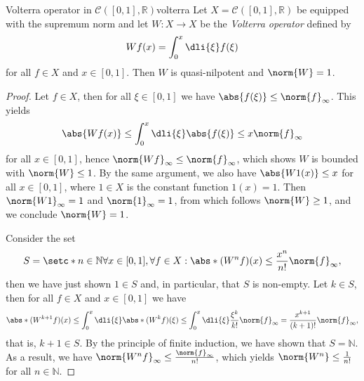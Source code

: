 \begin{example}{Volterra operator in \(\mathcal{C}([0, 1], \mathbb{R})\)}{volterra}
    Let \(X = \mathcal{C}([0,1], \mathbb{R})\) be equipped with the supremum norm and let \(W : X \to X\) be the \emph{Volterra operator} defined by
    \begin{equation*}
        Wf(x) = \int_0^x \dli{\xi} f(\xi)
    \end{equation*}
    for all \(f \in X\) and \(x \in [0,1]\). Then \(W\) is quasi-nilpotent and \(\norm{W} = 1\).
\end{example}
\begin{proof}
    Let \(f \in X\), then for all \(\xi \in [0,1]\) we have \(\abs{f(\xi)} \leq \norm{f}_\infty\). This yields
    \begin{equation*}
        \abs{Wf(x)} \leq \int_0^x \dli{\xi} \abs{f(\xi)} \leq x \norm{f}_\infty
    \end{equation*}
    for all \(x \in [0,1]\), hence \(\norm{Wf}_\infty \leq \norm{f}_\infty\), which shows \(W\) is bounded with \(\norm{W} \leq 1\). By the same argument, we also have \(\abs{W1(x)} \leq x\) for all \(x \in [0,1]\), where \(1 \in X\) is the constant function \(1(x) = 1\). Then \(\norm{W1}_\infty = 1\) and \(\norm{1}_\infty = 1\), from which follows \(\norm{W} \geq 1\), and we conclude \(\norm{W} = 1\).

    Consider the set
    \begin{equation*}
        S = \setc*{n \in \mathbb{N}}{\forall x \in [0,1], \forall f \in X : \abs*{(W^nf)(x)} \leq \frac{x^n}{n!} \norm{f}_\infty},
    \end{equation*}
    then we have just shown \(1 \in S\) and, in particular, that \(S\) is non-empty. Let \(k \in S\), then for all \(f \in X\) and \(x \in [0,1]\) we have
    \begin{equation*}
        \abs*{(W^{k+1}f)(x)} \leq \int_0^x \dli{\xi} \abs*{(W^kf)(\xi)} \leq \int_0^x \dli{\xi} \frac{\xi^k}{k!}\norm{f}_\infty = \frac{x^{k+1}}{(k+1)!}\norm{f}_\infty,
    \end{equation*}
    that is, \(k + 1 \in S\). By the principle of finite induction, we have shown that \(S = \mathbb{N}\). As a result, we have \(\norm{W^n f}_\infty \leq \frac{\norm{f}_\infty}{n!}\), which yields \(\norm{W^n} \leq \frac{1}{n!}\) for all \(n \in \mathbb{N}\).


\end{proof}
